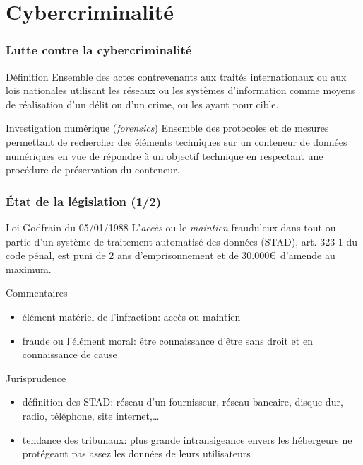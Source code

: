 \begin{reveals}
\begin{frame}
\end{frame}

\section{Cybercriminalité}

\begin{frame}
  \frametitle{Lutte contre la cybercriminalité}

  \vfill
  \begin{block}{Définition}
    Ensemble des actes contrevenants aux traités internationaux ou aux
    lois nationales utilisant les réseaux ou les systèmes
    d'information comme moyens de réalisation d’un délit ou d'un
    crime, ou les ayant pour cible.
  \end{block}
  \vfill
  \begin{block}{Investigation numérique (\emph{forensics})}
    Ensemble des protocoles et de mesures permettant de rechercher des
    éléments techniques sur un conteneur de données numériques en vue
    de répondre à un objectif technique en respectant une procédure de
    préservation du conteneur.
  \end{block}
\end{frame}

\begin{frame}
  \frametitle{État de la législation (1/2)}
  \vfill
  \begin{block}{Loi Godfrain du 05/01/1988}
    \small L'\emph{accès} ou le \emph{maintien} frauduleux dans tout ou partie d'un système de traitement automatisé des données (STAD), art. 323-1 du code pénal, est puni de 2 ans d'emprisonnement et de 30.000\euro\ d'amende au maximum.
  \end{block}
  \vfill
  \begin{block}{Commentaires}
    \small
    \begin{itemize}
    \item élément matériel de l'infraction: accès ou maintien
    \item fraude ou l'élément moral: être connaissance d'être sans droit et en connaissance de cause
    \end{itemize}
  \end{block}
  \vfill
  \begin{block}{Jurisprudence}\small
    \begin{itemize}
    \item définition des STAD: réseau d'un fournisseur, réseau bancaire, disque dur, radio, téléphone, site internet,\ldots
    \item tendance des tribunaux: plus grande intransigeance envers
      les hébergeurs ne protégeant pas assez les données de leurs
      utilisateurs
    \end{itemize}
  \end{block}
  \vfill
\end{frame}


\end{reveals}
